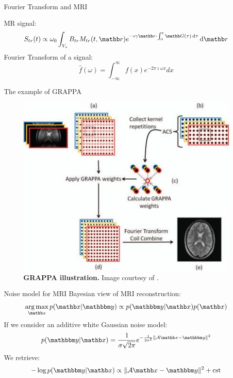 \begin{frame}{Fourier Transform and MRI}
    \begin{multicols}{2}
        MR signal:
        \begin{equation*}
            \vspace{\baselineskip}
            S_{tr}(t) \propto \omega_0  \int_{V_s} B_{tr} M_{tr}(t, \rb) e^{-\imath \gamma \rb \cdot \int_0^t \Gb(\tau)  \dif \tau} \dif \rb
        \end{equation*}
        \newpage
        Fourier Transform of a signal:
        \begin{equation*}
            \hat{f}(\omega) = \int_{-\infty}^{\infty} f(x) e^{-2\pi \imath \omega x} dx
        \end{equation*}
    \end{multicols}
\end{frame}

\begin{frame}{The example of GRAPPA}
    \begin{figure}
        \centering
        \includegraphics[height=0.6\textheight]{Figures/intro_figures/GRAPPA.jpeg}
        \caption{\label{fig:GRAPPA}\textbf{GRAPPA illustration.} Image courtesy of \citet{deshmane2012parallel}.
        }
    \end{figure}
\end{frame}


\begin{frame}{Noise model for MRI}
    Bayesian view of MRI reconstruction:
    \begin{equation*}
        \argmax_{\xb} p(\xb|\ybb) \propto p(\ybb|\xb) p(\xb)
    \end{equation*}
    If we consider an additive white Gaussian noise model:
    \begin{equation*}
        p(\ybb|\xb) = \frac{1}{\sigma \sqrt{2\pi}} e^{-\frac{1}{2\sigma^2} \|\mathcal{A}\xb - \ybb \| ^2 }
    \end{equation*}
    We retrieve:
    \begin{equation*}
        - \log p(\ybb|\xb) \propto \|\mathcal{A}\xb - \ybb \| ^2 + \text{cst}
    \end{equation*}
\end{frame}

